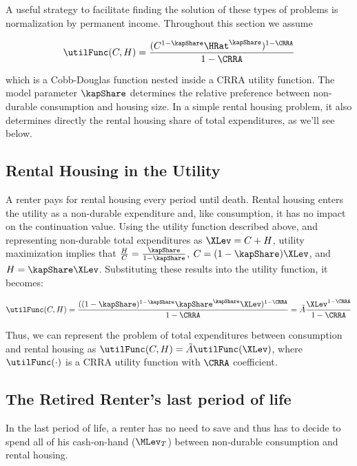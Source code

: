 \documentclass[PortfolioChoiceWithRiskyHousing]{subfiles}
\begin{document}
A useful strategy to facilitate finding the solution of these types of problems is normalization by permanent income. Throughout this section we assume

\begin{equation}
	\utilFunc(C, H) = \frac{(C^{1-\kapShare} \HRat^\kapShare)^{1-\CRRA}}{1-\CRRA}
\end{equation}

which is a Cobb-Douglas function nested inside a CRRA utility function. The model parameter $\kapShare$ determines the relative preference between non-durable consumption and housing size. In a simple rental housing problem, it also determines directly the rental housing share of total expenditures, as we'll see below.

\subsection{Rental Housing in the Utility}

A renter pays for rental housing every period until death. Rental housing enters the utility as a non-durable expenditure and, like consumption, it has no impact on the continuation value. Using the utility function described above, and representing non-durable total expenditures as $\XLev = C + H$, utility maximization implies that $\frac{H}{C} = \frac{\kapShare}{1-\kapShare}$, $C = (1-\kapShare)\XLev$, and $ H = \kapShare \XLev$. Substituting these results into the utility function, it becomes:

\begin{equation}
	\utilFunc(C,H) = \frac{((1-\kapShare)^{1-\kapShare} \kapShare^\kapShare \XLev)^{1-\CRRA}}{1-\CRRA} = \tilde{A} \frac{\XLev^{1-\CRRA}}{1-\CRRA}
\end{equation}

Thus, we can represent the problem of total expenditures between consumption and rental housing as $\utilFunc(C,H) = \tilde{A} \utilFunc(\XLev)$, where $\utilFunc(\cdot)$ is a CRRA utility function with $\CRRA$ coefficient.

\subsection{The Retired Renter's last period of life}

In the last period of life, a renter has no need to save and thus has to decide to spend all of his cash-on-hand ($\MLev_{T}$) between non-durable consumption and rental housing.
\end{document}
